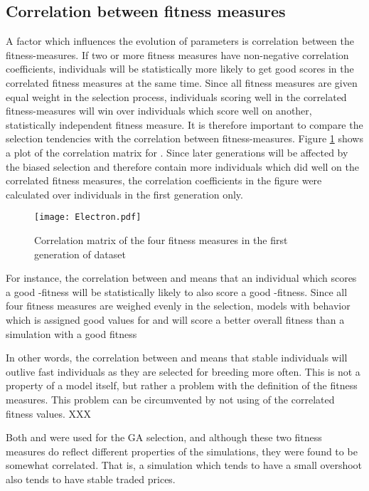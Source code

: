 \subsection{Correlation between fitness measures}\label{section:correlation_fitness}
A factor which influences the evolution of parameters is correlation between the fitness-measures. If two or more fitness measures have non-negative correlation coefficients, individuals will be statistically more likely to get good scores in the correlated fitness measures at the same time. Since all fitness measures are given equal weight in the selection process, individuals scoring well in the correlated fitness-measures will win over individuals which score well on another, statistically independent fitness measure. It is therefore important to compare the selection tendencies with the correlation between fitness-measures. Figure \ref{figure:d10_fitness_correlation} shows a plot of the correlation matrix for \dten. Since later generations will be affected by the biased selection and therefore contain more individuals which did well on the correlated fitness measures, the correlation coefficients in the figure were calculated over individuals in the first generation only.
\begin{figure}
\centering
\texttt{[image: Electron.pdf]}
\caption{Correlation matrix of the four fitness measures in the first generation of dataset \dten	}
\label{figure:d10_fitness_correlation}
\end{figure}

For instance, the correlation between \overshoot and \stdev means that an individual which scores a good \overshoot-fitness will be statistically likely to also score a good \stdev-fitness. Since all four fitness measures are weighed evenly in the selection, models with behavior which is assigned good values for \overshoot and \stdev will score a better overall fitness than a simulation with a good fitness 

In other words, the correlation between \stdev and \overshoot means that stable individuals will outlive fast individuals as they are selected for breeding more often. This is not a property of a model itself, but rather a problem with the definition of the fitness measures. This problem can be circumvented by not using of the correlated fitness values. XXX

Both \overshoot and \stdev were used for the GA selection, and although these two fitness measures do reflect different properties of the simulations, they were found to be somewhat correlated. That is, a simulation which tends to have a small overshoot also tends to have stable traded prices. 

